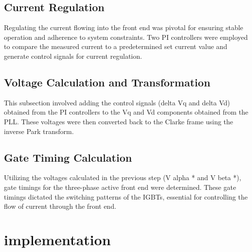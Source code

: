 \subsection{Current Regulation}
Regulating the current flowing into the front end was pivotal for ensuring
stable operation and adherence to system constraints. Two PI controllers were
employed to compare the measured current to a predetermined set current value
and generate control signals for current regulation.

\subsection{Voltage Calculation and Transformation}
This subsection involved adding the control signals (delta Vq and delta Vd)
obtained from the PI controllers to the Vq and Vd components obtained from the
PLL. These voltages were then converted back to the Clarke frame using the
inverse Park transform.

\subsection{Gate Timing Calculation}
Utilizing the voltages calculated in the previous step (V alpha * and V beta
*), gate timings for the three-phase active front end were determined. These
gate timings dictated the switching patterns of the IGBTs, essential for
controlling the flow of current through the front end.

\section{implementation}